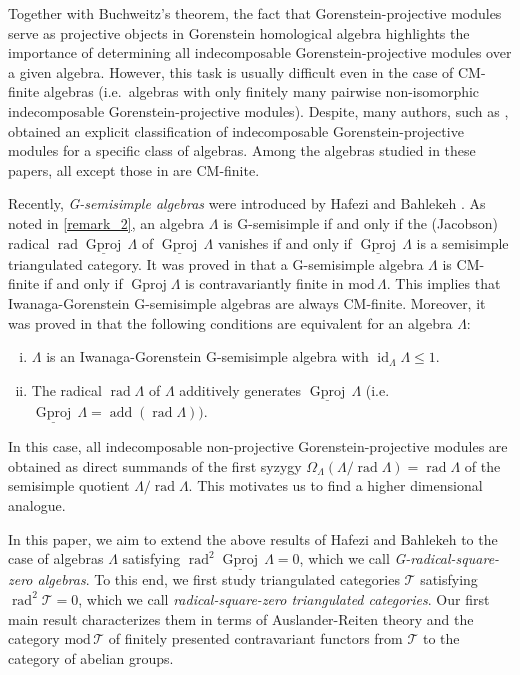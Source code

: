 \documentclass[12pt]{amsart}
\numberwithin{equation}{subsection}
\theoremstyle{plain}
\theoremstyle{definition}
\newcommand{\rad}{\operatorname{rad}}
\newcommand{\add}{\operatorname{add}}
\renewcommand{\mod}{\mathrm{mod}\,}
\newcommand{\Gproj}{\operatorname{Gproj}}
\newcommand{\sGproj}{\underline{\operatorname{Gproj}}\,}
\newcommand{\injdim}{\operatorname{id}}
\renewcommand{\L}{\Lambda}
\newcommand{\T}{\mathcal{T}}
\begin{document}
Together with Buchweitz's theorem, the fact that Gorenstein-projective modules serve as projective objects in Gorenstein homological algebra highlights the importance of determining all indecomposable Gorenstein-projective modules over a given algebra. 
However, this task is usually difficult even in the case of CM-finite algebras (i.e.~algebras with only finitely many pairwise non-isomorphic indecomposable Gorenstein-projective modules).
Despite, many authors, such as \cite{Chen-Shen-Zhou_2018,Kalck_2015,Ringel_2013,Ringel-Zhang_2017}, obtained an explicit classification of indecomposable Gorenstein-projective modules for a specific class of algebras.
Among the algebras studied in these papers, all except those in \cite{Ringel-Zhang_2017} are CM-finite.




Recently, {\it G-semisimple algebras} were introduced by Hafezi and Bahlekeh \cite[Definition 3.1]{Hafezi-Bahlekeh_2024}.
As noted in \cref{remark_2}, an algebra $\L$ is G-semisimple if and only if the (Jacobson) radical $\rad\sGproj\L$ of $\sGproj\L$ vanishes  if and only if $\sGproj\L$ is a semisimple triangulated category.
It was proved in \cite[Proposition 3.4]{Hafezi-Bahlekeh_2024} that a G-semisimple algebra $\L$ is CM-finite if and only if $\Gproj\L$ is contravariantly finite in $\mod\L$.
This implies that Iwanaga-Gorenstein G-semisimple algebras are always CM-finite.
Moreover, it was proved in \cite[Proposition 3.13]{Hafezi-Bahlekeh_2024} that the following conditions are equivalent for an algebra $\L$:
\begin{enumerate}[(i)]
    \item $\L$ is an Iwanaga-Gorenstein G-semisimple algebra with $\injdim_\L\L\leq 1$.
    \item The radical $\rad\L$ of $\L$ additively generates $\sGproj\L$ (i.e.~$\sGproj\L=\add(\rad\L))$.
\end{enumerate}
In this case, all indecomposable non-projective Gorenstein-projective modules are obtained as direct summands of the first syzygy $\Omega_\L(\L/\rad\L)=\rad\L$ of the semisimple quotient $\L/\rad\L$.
This motivates us to find a higher dimensional analogue.






In this paper, we aim to extend the above results of Hafezi and Bahlekeh to the case of algebras $\L$ satisfying $\rad^2\sGproj\L=0$, which we call {\it G-radical-square-zero algebras}.
To this end, we first study triangulated categories $\T$ satisfying $\rad^2\T=0$, which we call {\it radical-square-zero triangulated categories}. 
Our first main result characterizes them in terms of Auslander-Reiten theory and the category $\mod\T$ of finitely presented contravariant 
functors from $\T$ to the category of abelian groups.
\end{document}
